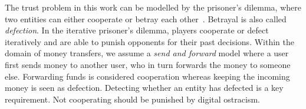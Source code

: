 


The trust problem in this work can be modelled by the prisoner's dilemma, where two entities can either cooperate or betray each other~\cite{kreps1982rational}.
Betrayal is also called \emph{defection}.
In the iterative prisoner's dilemma, players cooperate or defect iteratively and are able to punish opponents for their past decisions.
Within the domain of money transfers, we assume a \emph{send and forward} model where a user first sends money to another user, who in turn forwards the money to someone else.
Forwarding funds is considered cooperation whereas keeping the incoming money is seen as defection.
Detecting whether an entity has defected is a key requirement.
Not cooperating should be punished by digital ostracism.

